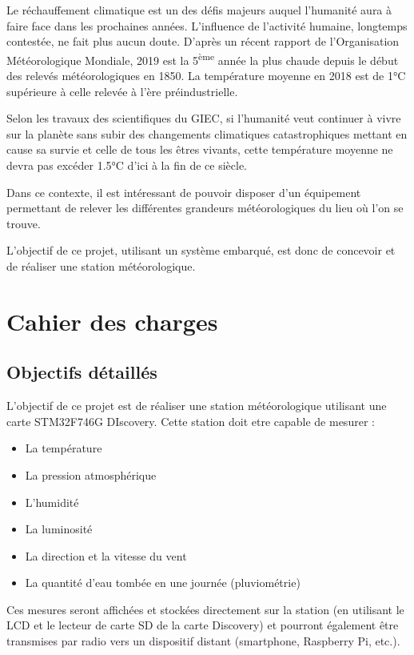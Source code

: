 \documentclass[12pt]{article}
\begin{document}
 







\tableofcontents
\label{toc} %


\listoffigures

\newpage


\clearpage
\setcounter{page}{3}

\pagestyle{fancy}

Le réchauffement climatique est un des défis majeurs auquel l'humanité aura à faire face dans les prochaines années. L'influence de l'activité humaine, longtemps contestée, ne fait plus aucun doute. D'après un récent rapport de l'Organisation Météorologique Mondiale, 2019 est la 5\textsuperscript{ème} année la plus chaude depuis le début des relevés météorologiques en 1850. La température moyenne en 2018 est de 1°C supérieure à celle relevée à l'ère préindustrielle.

Selon les travaux des scientifiques du GIEC, si l'humanité veut continuer à vivre sur la planète sans subir des changements climatiques catastrophiques mettant en cause sa survie et celle de tous les êtres vivants, cette température moyenne ne devra pas excéder 1.5°C d'ici à la fin de ce siècle.

Dans ce contexte, il est intéressant de pouvoir disposer d'un équipement permettant de relever les différentes grandeurs météorologiques du lieu où l'on se trouve.

L'objectif de ce projet, utilisant un système embarqué, est donc de concevoir et de réaliser une station météorologique.

\section{Cahier des charges}
\subsection{Objectifs détaillés}
L'objectif de ce projet est de réaliser une station météorologique utilisant une carte STM32F746G DIscovery.
Cette station doit etre capable de mesurer : 
\begin{itemize}
    \item La température
    \item La pression atmosphérique
    \item L'humidité
    \item La luminosité
    \item La direction et la vitesse du vent
    \item La quantité d'eau tombée en une journée (pluviométrie)
\end{itemize}
Ces mesures seront affichées et stockées directement sur la station (en utilisant le LCD et le lecteur de carte SD de la carte Discovery) et pourront également être transmises par radio vers un dispositif distant (smartphone, Raspberry Pi, etc.).
\end{document}
